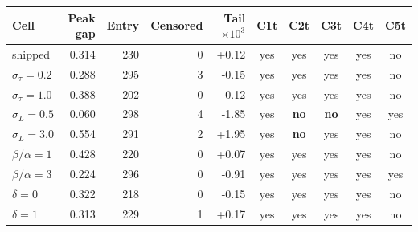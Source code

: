 \small
\begin{tabular}{lrrrrccccc}
\hline
Cell & Peak gap & Entry & Censored & Tail $\times 10^3$ & C1t & C2t & C3t & C4t & C5t \\
\hline
shipped & 0.314 & 230 & 0 & +0.12 & yes & yes & yes & yes & no \\
$\sigma_\tau = 0.2$ & 0.288 & 295 & 3 & -0.15 & yes & yes & yes & yes & no \\
$\sigma_\tau = 1.0$ & 0.388 & 202 & 0 & -0.12 & yes & yes & yes & yes & no \\
$\sigma_L = 0.5$ & 0.060 & 298 & 4 & -1.85 & yes & \textbf{no} & \textbf{no} & yes & yes \\
$\sigma_L = 3.0$ & 0.554 & 291 & 2 & +1.95 & yes & \textbf{no} & yes & yes & no \\
$\beta/\alpha = 1$ & 0.428 & 220 & 0 & +0.07 & yes & yes & yes & yes & no \\
$\beta/\alpha = 3$ & 0.224 & 296 & 0 & -0.91 & yes & yes & yes & yes & yes \\
$\delta = 0$ & 0.322 & 218 & 0 & -0.15 & yes & yes & yes & yes & no \\
$\delta = 1$ & 0.313 & 229 & 1 & +0.17 & yes & yes & yes & yes & no \\
\hline
\end{tabular}
